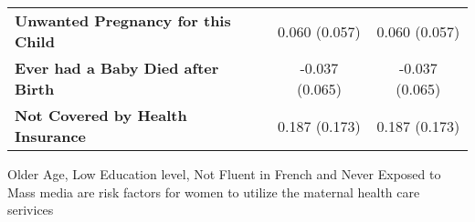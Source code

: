 \documentclass[13pt]{beamer}
\renewcommand{\footnotesize}{\scriptsize}
\renewcommand{\footnotesize}{\fontsize{9pt}{12pt}\selectfont}
\renewcommand{\footnotesize}{\tiny}
\begin{document}
\begin{frame}
\begin{table}[]
{\begin{tabular}{@{}lcc@{}}
	\textbf{Unwanted Pregnancy for this Child}                                                                                                 & 0.060 (0.057)                                                                                                          & 0.060 (0.057)                                                                                                          \\
	\textbf{Ever had a Baby Died after Birth}                                                                                                  & -0.037 (0.065)                                                                                                         & -0.037 (0.065)                                                                                                         \\
	\textbf{Not Covered by Health Insurance}                                                                                                   & 0.187 (0.173)                                                                                                          & 0.187 (0.173)                                                                                                          \\ \bottomrule
	\end{tabular}
	}
	\end{table}
	\footnotesize
    Older Age, Low Education level, Not Fluent in French and Never Exposed to Mass media are risk factors for women to utilize the maternal health care serivices
\end{frame}
\end{document}
